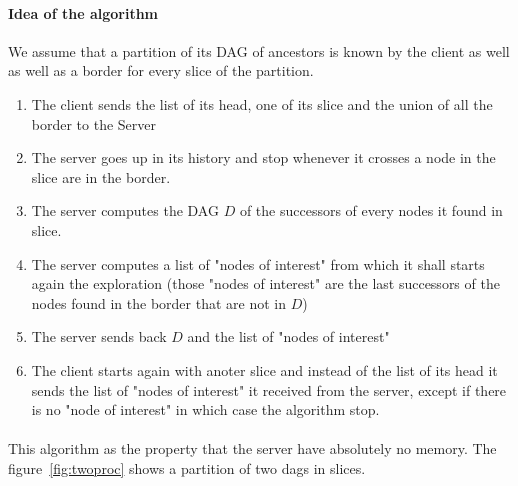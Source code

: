 \paragraph{Idea of the algorithm} We assume that a partition of its DAG of ancestors is known by the client as well as well as a border for every slice of the partition.
\begin{enumerate}
 \item The client sends the list of its head, one of its slice and the union of all the border to the Server
 \item The server goes up in its history and stop whenever it crosses a node in the slice are in the border.
 \item The server computes the DAG $D$ of the successors of every nodes it found in slice.
 \item The server computes a list of "nodes of interest" from which it shall starts again the exploration (those "nodes of interest" are the last successors of the nodes found in the border that are not in $D$)
 \item The server sends back $D$ and the list of "nodes of interest"
 \item The client starts again with anoter slice and instead of the list of its head it sends the list of "nodes of interest" it received from the server, except if there is no "node of interest" in which case the algorithm stop.
\end{enumerate}
\paragraph{} This algorithm as the property that the server have absolutely no memory. The figure~\ref{fig:twoproc} shows a partition of two dags in slices.

